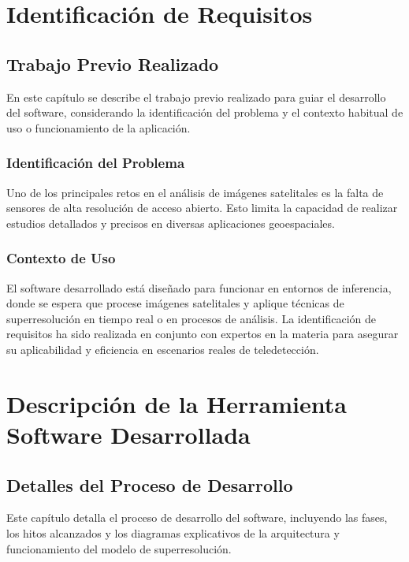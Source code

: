 \chapter{Identificación de Requisitos}

\section{Trabajo Previo Realizado}
En este capítulo se describe el trabajo previo realizado para guiar el desarrollo del software, considerando la identificación del problema y el contexto habitual de uso o funcionamiento de la aplicación.

\subsection{Identificación del Problema}
Uno de los principales retos en el análisis de imágenes satelitales es la falta de sensores de alta resolución de acceso abierto. Esto limita la capacidad de realizar estudios detallados y precisos en diversas aplicaciones geoespaciales.

\subsection{Contexto de Uso}
El software desarrollado está diseñado para funcionar en entornos de inferencia, donde se espera que procese imágenes satelitales y aplique técnicas de superresolución en tiempo real o en procesos de análisis. La identificación de requisitos ha sido realizada en conjunto con expertos en la materia para asegurar su aplicabilidad y eficiencia en escenarios reales de teledetección.

\chapter{Descripción de la Herramienta Software Desarrollada}

\section{Detalles del Proceso de Desarrollo}
Este capítulo detalla el proceso de desarrollo del software, incluyendo las fases, los hitos alcanzados y los diagramas explicativos de la arquitectura y funcionamiento del modelo de superresolución.

